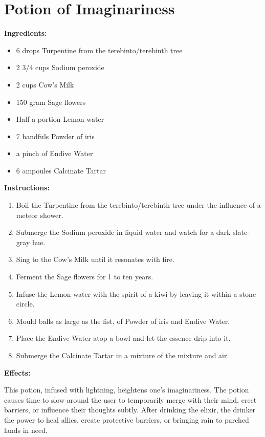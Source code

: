 \documentclass{article}
\begin{document}
\newpage
\section*{Potion of Imaginariness}

\textbf{Ingredients:}

\begin{itemize}
  \item 6 drops Turpentine from the terebinto/terebinth tree
  \item 2 3/4 cups Sodium peroxide
  \item 2 cups Cow's Milk
  \item 150 gram Sage flowers
  \item Half a portion Lemon-water
  \item 7 handfuls Powder of iris
  \item a pinch of Endive Water
  \item 6 ampoules Calcinate Tartar
\end{itemize}

\textbf{Instructions:}

\begin{enumerate}
  \item Boil the Turpentine from the terebinto/terebinth tree under the influence of a meteor shower.
  \item Submerge the Sodium peroxide in liquid water and watch for a dark slate-gray hue.
  \item Sing to the Cow's Milk until it resonates with fire.
  \item Ferment the Sage flowers for 1 to ten years.
  \item Infuse the Lemon-water with the spirit of a kiwi by leaving it within a stone circle.
  \item Mould balls as large as the fist, of Powder of iris and Endive Water.
  \item Place the Endive Water atop a bowl and let the essence drip into it.
  \item Submerge the Calcinate Tartar in a mixture of the mixture and air.
\end{enumerate}

\textbf{Effects:}

This potion, infused with lightning, heightens one's imaginariness. The potion causes time to slow around the user to temporarily merge with their mind, erect barriers, or influence their thoughts subtly. After drinking the elixir, the drinker the power to heal allies, create protective barriers, or bringing rain to parched lands in need.
\end{document}
